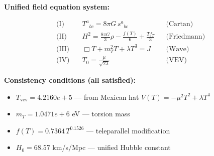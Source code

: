 
\textbf{Unified field equation system:}

\begin{align}
  \text{(I)} \quad & T^a{}_{bc} = 8\pi G \, s^a{}_{bc} && \text{(Cartan)} \\
  \text{(II)} \quad & H^2 = \frac{8\pi G}{3}\rho - \frac{f(T)}{6} + \frac{Tf_T}{3} && \text{(Friedmann)} \\
  \text{(III)} \quad & \Box T + m_T^2 T + \lambda T^3 = J && \text{(Wave)} \\
  \text{(IV)} \quad & T_0 = \frac{\mu}{\sqrt{2\lambda}} && \text{(VEV)}
\end{align}

\textbf{Consistency conditions (all satisfied):}
\begin{itemize}
  \item $T_{\text{vev}} = 4.2160e+5$ — from Mexican hat $V(T) = -\mu^2 T^2 + \lambda T^4$
  \item $m_T = 1.0471e+6$ eV — torsion mass
  \item $f(T) = 0.7364 \, T^{0.1526}$ — teleparallel modification
  \item $H_0 = 68.57$ km/s/Mpc — unified Hubble constant
\end{itemize}
